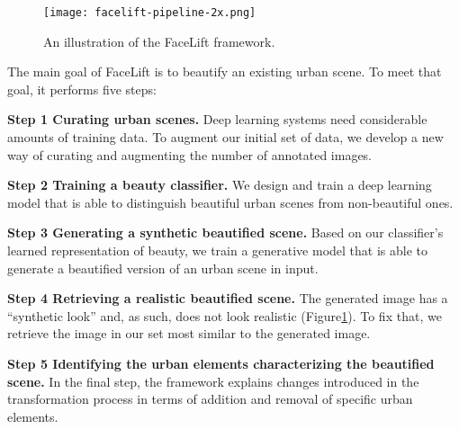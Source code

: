 \begin{figure}[ht]
    \centering
    \texttt{[image: facelift-pipeline-2x.png]}
    \caption{An illustration of the FaceLift framework.}
    \label{fig:framework}
\end{figure}

The main goal of FaceLift is to beautify an existing urban scene. To meet that goal, it performs five steps: 
\begin{description}
    \item \textbf{Step 1 Curating urban scenes.} Deep learning systems need considerable amounts of training data. To augment our initial set of data, we develop a new way of curating and augmenting the number of annotated images.  
    \item \textbf{Step 2 Training a beauty classifier.} We design and train a deep learning model that is able to distinguish beautiful urban scenes from non-beautiful ones. 
    \item \textbf{Step 3 Generating a synthetic beautified scene.} Based on our classifier's learned representation of beauty, we train a generative model that is able to generate a  beautified version 
    of an urban scene in input. 
    \item \textbf{Step 4 Retrieving a realistic beautified scene.} The generated image has a ``synthetic look'' and, as such, does not look realistic (Figure\ref{fig:framework}). To fix that, we retrieve the image in our set  most similar to the generated image. 
    \item \textbf{Step 5 Identifying the urban elements characterizing the beautified scene.} In the final step, the framework explains changes introduced in the transformation process in terms of addition and removal of specific urban elements. 
\end{description}


